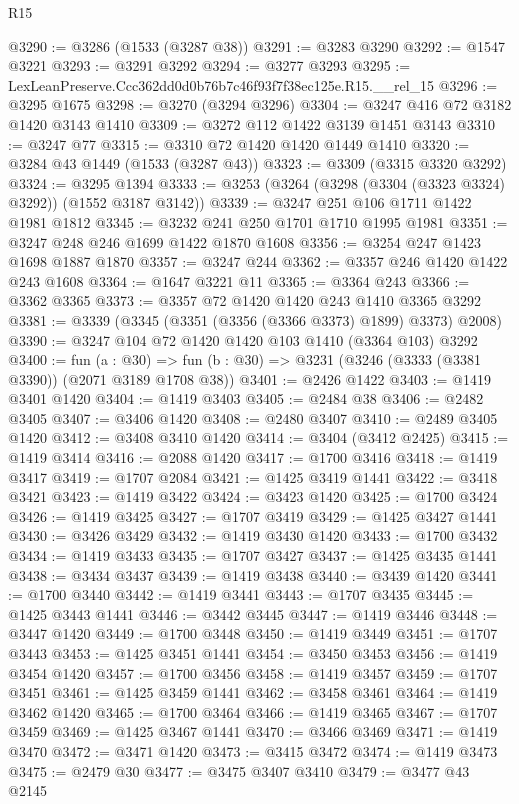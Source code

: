 \begin{lexlean}{R15}
\begin{coremodule}
@3290 := @3286 (@1533 (@3287 @38))
@3291 := @3283 @3290
@3292 := @1547 @3221
@3293 := @3291 @3292
@3294 := @3277 @3293
@3295 := LexLeanPreserve.Ccc362dd0d0b76b7c46f93f7f38ec125e.R15.__rel_15
@3296 := @3295 @1675
@3298 := @3270 (@3294 @3296)
@3304 := @3247 @416 @72 @3182 @1420 @3143 @1410
@3309 := @3272 @112 @1422 @3139 @1451 @3143
@3310 := @3247 @77
@3315 := @3310 @72 @1420 @1420 @1449 @1410
@3320 := @3284 @43 @1449 (@1533 (@3287 @43))
@3323 := @3309 (@3315 @3320 @3292)
@3324 := @3295 @1394
@3333 := @3253 (@3264 (@3298 (@3304 (@3323 @3324) @3292)) (@1552 @3187 @3142))
@3339 := @3247 @251 @106 @1711 @1422 @1981 @1812
@3345 := @3232 @241 @250 @1701 @1710 @1995 @1981
@3351 := @3247 @248 @246 @1699 @1422 @1870 @1608
@3356 := @3254 @247 @1423 @1698 @1887 @1870
@3357 := @3247 @244
@3362 := @3357 @246 @1420 @1422 @243 @1608
@3364 := @1647 @3221 @11
@3365 := @3364 @243
@3366 := @3362 @3365
@3373 := @3357 @72 @1420 @1420 @243 @1410 @3365 @3292
@3381 := @3339 (@3345 (@3351 (@3356 (@3366 @3373) @1899) @3373) @2008)
@3390 := @3247 @104 @72 @1420 @1420 @103 @1410 (@3364 @103) @3292
@3400 := fun (a : @30) =>
  fun (b : @30) => @3231 (@3246 (@3333 (@3381 @3390)) (@2071 @3189 @1708 @38))
@3401 := @2426 @1422
@3403 := @1419 @3401 @1420
@3404 := @1419 @3403
@3405 := @2484 @38
@3406 := @2482 @3405
@3407 := @3406 @1420
@3408 := @2480 @3407
@3410 := @2489 @3405 @1420
@3412 := @3408 @3410 @1420
@3414 := @3404 (@3412 @2425)
@3415 := @1419 @3414
@3416 := @2088 @1420
@3417 := @1700 @3416
@3418 := @1419 @3417
@3419 := @1707 @2084
@3421 := @1425 @3419 @1441
@3422 := @3418 @3421
@3423 := @1419 @3422
@3424 := @3423 @1420
@3425 := @1700 @3424
@3426 := @1419 @3425
@3427 := @1707 @3419
@3429 := @1425 @3427 @1441
@3430 := @3426 @3429
@3432 := @1419 @3430 @1420
@3433 := @1700 @3432
@3434 := @1419 @3433
@3435 := @1707 @3427
@3437 := @1425 @3435 @1441
@3438 := @3434 @3437
@3439 := @1419 @3438
@3440 := @3439 @1420
@3441 := @1700 @3440
@3442 := @1419 @3441
@3443 := @1707 @3435
@3445 := @1425 @3443 @1441
@3446 := @3442 @3445
@3447 := @1419 @3446
@3448 := @3447 @1420
@3449 := @1700 @3448
@3450 := @1419 @3449
@3451 := @1707 @3443
@3453 := @1425 @3451 @1441
@3454 := @3450 @3453
@3456 := @1419 @3454 @1420
@3457 := @1700 @3456
@3458 := @1419 @3457
@3459 := @1707 @3451
@3461 := @1425 @3459 @1441
@3462 := @3458 @3461
@3464 := @1419 @3462 @1420
@3465 := @1700 @3464
@3466 := @1419 @3465
@3467 := @1707 @3459
@3469 := @1425 @3467 @1441
@3470 := @3466 @3469
@3471 := @1419 @3470
@3472 := @3471 @1420
@3473 := @3415 @3472
@3474 := @1419 @3473
@3475 := @2479 @30
@3477 := @3475 @3407 @3410
@3479 := @3477 @43 @2145

\end{coremodule}
\end{lexlean}
